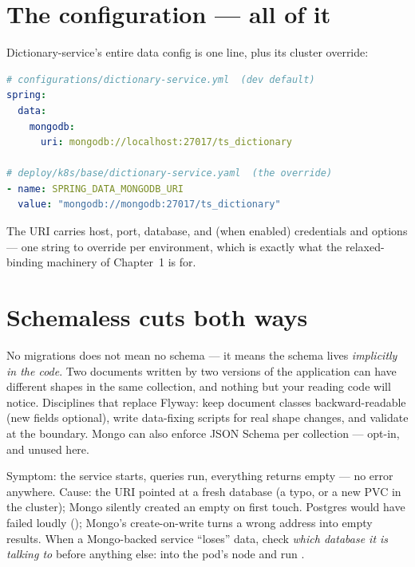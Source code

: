 \section{The configuration --- all of it}

Dictionary-service's entire data config is one line, plus its cluster
override:

\begin{lstlisting}[language=yaml]
# configurations/dictionary-service.yml  (dev default)
spring:
  data:
    mongodb:
      uri: mongodb://localhost:27017/ts_dictionary

# deploy/k8s/base/dictionary-service.yaml  (the override)
- name: SPRING_DATA_MONGODB_URI
  value: "mongodb://mongodb:27017/ts_dictionary"
\end{lstlisting}

The URI carries host, port, database, and (when enabled) credentials and
options --- one string to override per environment, which is exactly what
the relaxed-binding machinery of Chapter~1 is for.

\section{Schemaless cuts both ways}

No migrations does not mean no schema --- it means the schema lives
\emph{implicitly in the code}. Two documents written by two versions of
the application can have different shapes in the same collection, and
nothing but your reading code will notice. Disciplines that replace
Flyway: keep document classes backward-readable (new fields optional),
write data-fixing scripts for real shape changes, and validate at the
boundary. Mongo can also enforce JSON Schema per collection ---
opt-in, and unused here.

\begin{pitfall}
Symptom: the service starts, queries run, everything returns empty ---
no error anywhere. Cause: the URI pointed at a fresh database (a typo,
or a new PVC in the cluster); Mongo silently created an empty
 on first touch. Postgres would have failed loudly
(); Mongo's create-on-write turns a wrong
address into empty results. When a Mongo-backed service ``loses'' data,
check \emph{which database it is talking to} before anything else:
 into the pod's node and run
.
\end{pitfall}

